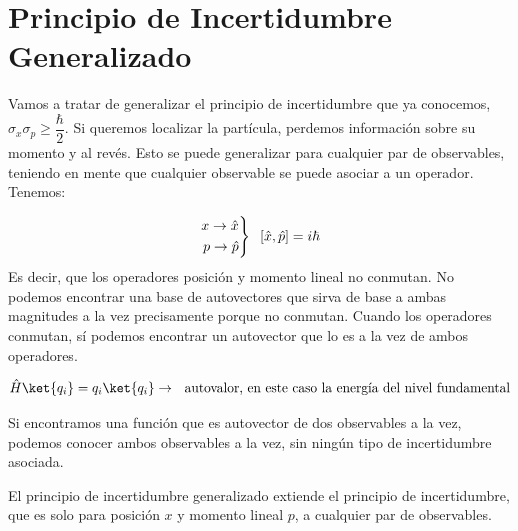 \documentclass{report}
\begin{document}
  \vspace{0.2cm}
  \section{Principio de Incertidumbre Generalizado}
    \noindent Vamos a tratar de generalizar el principio de incertidumbre que ya conocemos, 
    $\sigma_x\sigma_p\geq\dfrac{\hbar}{2}$. Si queremos localizar la partícula, 
    perdemos información sobre su momento y al revés. Esto se puede 
    generalizar para cualquier par de observables, teniendo en mente 
    que cualquier observable se puede asociar a un operador. Tenemos:

    \[\left.
      \begin{aligned}
        x\rightarrow \hat{x}\\
        p\rightarrow \hat{p}
      \end{aligned}
      \right\}\hspace{0.2cm}\left[\hat{x},\hat{p}\right]=i\hbar
    \]
    Es decir, que los operadores posición y momento lineal no conmutan. 
    No podemos encontrar una base de autovectores que sirva de base a 
    ambas magnitudes a la vez precisamente porque no conmutan.
    Cuando los operadores conmutan, sí podemos encontrar un autovector
    que lo es a la vez de ambos operadores.

    \[
      \hat{H}\ket{q_i}=q_i\ket{q_i} \rightarrow \ \text{ autovalor, en 
      este caso la energía del nivel fundamental}
    \]

    \noindent Si encontramos una función que es autovector de dos observables a
    la vez, podemos conocer ambos observables a la vez, sin ningún tipo
    de incertidumbre asociada.


    \noindent El principio de incertidumbre generalizado extiende el principio de 
    incertidumbre, que es solo para posición $x$ y momento lineal $p$, a
    cualquier par de observables. 
\end{document}

